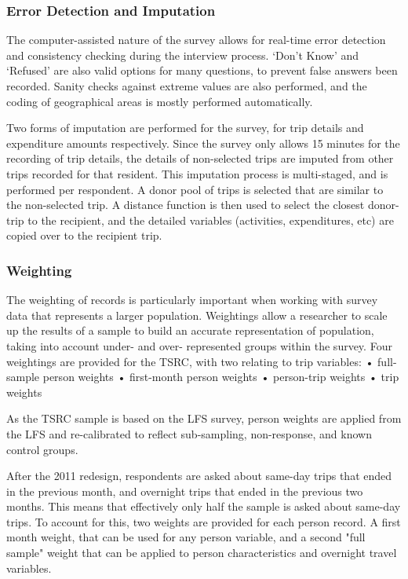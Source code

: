 \subsubsection{Error Detection and Imputation}
The computer-assisted nature of the survey allows for real-time error detection and consistency checking during the interview process. ‘Don’t Know’ and ‘Refused’ are also valid options for many questions, to prevent false answers been recorded. Sanity checks against extreme values are also performed, and the coding of geographical areas is mostly performed automatically.

Two forms of imputation are performed for the survey, for trip details and expenditure amounts respectively. Since the survey only allows 15 minutes for the recording of trip details, the details of non-selected trips are imputed from other trips recorded for that resident. This imputation process is multi-staged, and is performed per respondent. A donor pool of trips is selected that are similar to the non-selected trip. A distance function is then used to select the closest donor-trip to the recipient, and the detailed variables (activities, expenditures, etc) are copied over to the recipient trip.

\subsubsection{Weighting}
The weighting of records is particularly important when working with survey data that represents a larger population. Weightings allow a researcher to scale up the results of a sample to build an accurate representation of population, taking into account under- and over- represented groups within the survey. Four weightings are provided for the TSRC, with two relating to trip variables:
•	full-sample person weights
•	first-month person weights
•	person-trip weights
•	trip weights

As the TSRC sample is based on the LFS survey, person weights are applied from the LFS and re-calibrated to reflect sub-sampling, non-response, and known control groups. 

After the 2011 redesign, respondents are asked about same-day trips that ended in the previous month, and overnight trips that ended in the previous two months. This means that effectively only half the sample is asked about same-day trips. To account for this, two weights are provided for each person record. A first month weight, that can be used for any person variable, and a second "full sample" weight that can be applied to person characteristics and overnight travel variables.

